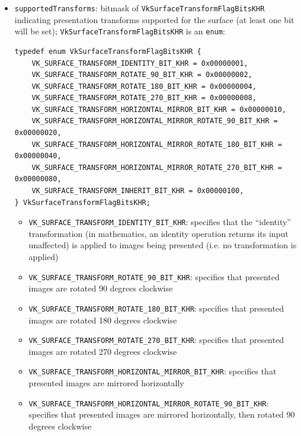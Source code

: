 \documentclass[12pt,letterpaper]{article}
\newcommand{\inquotes}[1]{``#1''}	%
\newcommand{\cil}[1]{\texttt{#1}}
\begin{document}
\begin{itemize}
        \item \cil{supportedTransforms}: bitmask of \cil{VkSurfaceTransformFlagBitsKHR} indicating presentation transforms supported for the surface (at least one bit will be set); \cil{VkSurfaceTransformFlagBitsKHR} is an \cil{enum}:
            \begin{verbatim}
typedef enum VkSurfaceTransformFlagBitsKHR {
    VK_SURFACE_TRANSFORM_IDENTITY_BIT_KHR = 0x00000001,
    VK_SURFACE_TRANSFORM_ROTATE_90_BIT_KHR = 0x00000002,
    VK_SURFACE_TRANSFORM_ROTATE_180_BIT_KHR = 0x00000004,
    VK_SURFACE_TRANSFORM_ROTATE_270_BIT_KHR = 0x00000008,
    VK_SURFACE_TRANSFORM_HORIZONTAL_MIRROR_BIT_KHR = 0x00000010,
    VK_SURFACE_TRANSFORM_HORIZONTAL_MIRROR_ROTATE_90_BIT_KHR = 0x00000020,
    VK_SURFACE_TRANSFORM_HORIZONTAL_MIRROR_ROTATE_180_BIT_KHR = 0x00000040,
    VK_SURFACE_TRANSFORM_HORIZONTAL_MIRROR_ROTATE_270_BIT_KHR = 0x00000080,
    VK_SURFACE_TRANSFORM_INHERIT_BIT_KHR = 0x00000100,
} VkSurfaceTransformFlagBitsKHR;
            \end{verbatim}
            
            \begin{itemize}
                \item \cil{VK_SURFACE_TRANSFORM_IDENTITY_BIT_KHR}: specifies that the \inquotes{identity} transformation (in mathematics, an identity operation returns its input unaffected) is applied to images being presented (i.e. no transformation is applied)
                
                \item \cil{VK_SURFACE_TRANSFORM_ROTATE_90_BIT_KHR}: specifies that presented images are rotated 90 degrees clockwise
                
                \item \cil{VK_SURFACE_TRANSFORM_ROTATE_180_BIT_KHR}: specifies that presented images are rotated 180 degrees clockwise
                
                \item \cil{VK_SURFACE_TRANSFORM_ROTATE_270_BIT_KHR}: specifies that presented images are rotated 270 degrees clockwise
                
                \item \cil{VK_SURFACE_TRANSFORM_HORIZONTAL_MIRROR_BIT_KHR}: specifies that presented images are mirrored horizontally
                
                \item \cil{VK_SURFACE_TRANSFORM_HORIZONTAL_MIRROR_ROTATE_90_BIT_KHR}:  specifies that presented images are mirrored horizontally, then rotated 90 degrees clockwise
                

\end{itemize}
\end{itemize}
\end{document}
